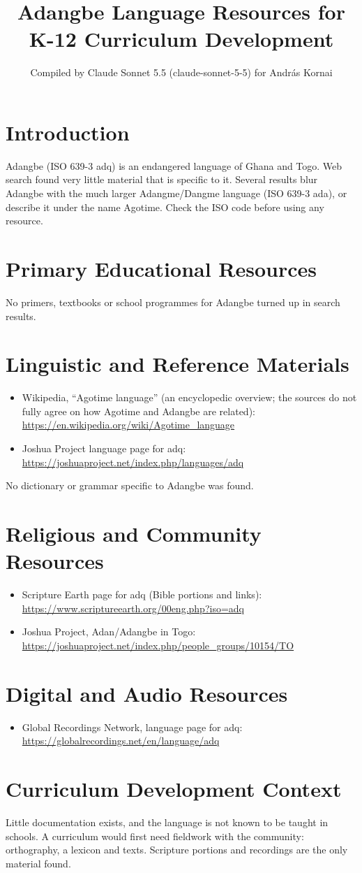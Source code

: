 \documentclass[12pt]{article}
\title{Adangbe Language Resources for K-12 Curriculum Development}
\author{Compiled by Claude Sonnet 5.5 (claude-sonnet-5-5) for Andr\'as Kornai}
\date{}
\begin{document}
\maketitle

\section{Introduction}
Adangbe (ISO 639-3 adq) is an endangered language of Ghana and Togo. Web search found very little material that is specific to it. Several results blur Adangbe with the much larger Adangme/Dangme language (ISO 639-3 ada), or describe it under the name Agotime. Check the ISO code before using any resource.

\section{Primary Educational Resources}
No primers, textbooks or school programmes for Adangbe turned up in search results.

\section{Linguistic and Reference Materials}
\begin{itemize}
\item Wikipedia, ``Agotime language'' (an encyclopedic overview; the sources do not fully agree on how Agotime and Adangbe are related): \url{https://en.wikipedia.org/wiki/Agotime_language}
\item Joshua Project language page for adq: \url{https://joshuaproject.net/index.php/languages/adq}
\end{itemize}
No dictionary or grammar specific to Adangbe was found.

\section{Religious and Community Resources}
\begin{itemize}
\item Scripture Earth page for adq (Bible portions and links): \url{https://www.scriptureearth.org/00eng.php?iso=adq}
\item Joshua Project, Adan/Adangbe in Togo: \url{https://joshuaproject.net/index.php/people_groups/10154/TO}
\end{itemize}

\section{Digital and Audio Resources}
\begin{itemize}
\item Global Recordings Network, language page for adq: \url{https://globalrecordings.net/en/language/adq}
\end{itemize}

\section{Curriculum Development Context}
Little documentation exists, and the language is not known to be taught in schools. A curriculum would first need fieldwork with the community: orthography, a lexicon and texts. Scripture portions and recordings are the only material found.
\end{document}
